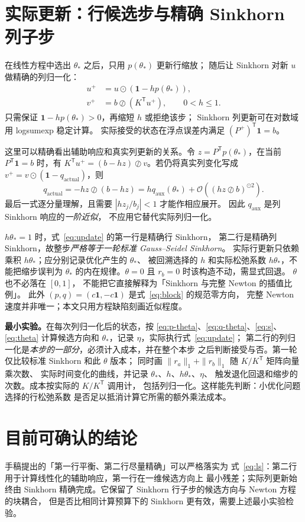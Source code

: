 \documentclass[11pt,a4paper]{ctexart}
\newcommand{\vone}{\bm{1}}
\newcommand{\trans}{\mathsf{T}}
\begin{document}
\section{实际更新：行候选步与精确 Sinkhorn 列子步}

在线性方程中选出 $\theta_*$ 之后，只用 $p(\theta_*)$ 更新行缩放；
随后让 Sinkhorn 对新 $u$ 做精确的列归一化：
\begin{equation}\label{eq:update}
 \boxed{\begin{aligned}
 u^+&=u\odot(\vone-hp(\theta_*)),\\
 v^+&=b\oslash(K^{\trans}u^+),\qquad 0<h\leq1.
 \end{aligned}}
\end{equation}
只需保证 $\vone-hp(\theta_*)>0$，再缩短 $h$ 或拒绝该步；
Sinkhorn 列更新可在对数域用 logsumexp 稳定计算。
实际接受的状态在浮点误差内满足 $(P^+)^{\trans}\vone=b$。

这里可以精确看出辅助响应和真实列更新的关系。令
$z=P^{\trans}p(\theta_*)$，在当前 $P^{\trans}\vone=b$ 时，有
$K^{\trans}u^+=(b-hz)\oslash v$。若仍将真实列变化写成
$v^+=v\odot(\vone-q_{\mathrm{actual}})$，则
\begin{equation}\label{eq:q-actual}
 q_{\mathrm{actual}}=-hz\oslash(b-hz)
 =h q_{\mathrm{aux}}(\theta_*)
   +\mathcal O\!\left((hz\oslash b)^{\odot2}\right).
\end{equation}
最后一式逐分量理解，且需要 $|hz_j/b_j|<1$ 才能作相应展开。
因此 $q_{\mathrm{aux}}$ 是列 Sinkhorn 响应的\emph{一阶近似}，
不应用它替代实际列归一化。

\begin{checknote}
$h\theta_*=1$ 时，式~\eqref{eq:update} 的第一行是精确行 Sinkhorn，
第二行是精确列 Sinkhorn，故整步\emph{严格等于一轮标准 Gauss--Seidel Sinkhorn}。
实际行更新只依赖乘积 $h\theta_*$；应分别记录优化产生的 $\theta_*$、
被回溯选择的 $h$ 和实际松弛系数 $h\theta_*$，不能把缩步误判为
$\theta_*$ 的内在规律。$\theta=0$ 且 $r_b=0$ 时该构造不动，需显式回退。
$\theta$ 也不必落在 $[0,1]$，
不能把它直接解释为「Sinkhorn 与完整 Newton 的插值比例」。
此外 $(p,q)=(c\vone,-c\vone)$ 是式~\eqref{eq:block} 的规范零方向，
完整 Newton 速度并非唯一；本文只用方程缺陷刻画近似程度。
\end{checknote}

\noindent\textbf{最小实验。}在每次列归一化后的状态，按
\eqref{eq:p-theta}、\eqref{eq:q-theta}、\eqref{eq:s}、\eqref{eq:theta}
计算候选方向和 $\theta_*$，记录 $\eta$，实际执行式~\eqref{eq:update}；
第二行的列归一化是\emph{本步的一部分}，必须计入成本，并在整个本步
之后判断接受与否。第一轮仅比较标准 Sinkhorn 和此 $\theta$ 版本；
同时画 $\|r_a\|_1+\|r_b\|_1$ 随 $K/K^{\trans}$ 矩阵向量乘次数、
实际时间变化的曲线，并记录 $\theta_*$、$h$、$h\theta_*$、$\eta$、
触发退化回退和缩步的次数。成本按实际的 $K/K^{\trans}$ 调用计，
包括列归一化。这样能先判断：小优化问题选择的行松弛系数
是否足以抵消计算它所需的额外乘法成本。

\section*{目前可确认的结论}

手稿提出的「第一行平衡、第二行尽量精确」可以严格落实为
式~\eqref{eq:ls}：第二行用于计算线性化的辅助响应，第一行在一维候选方向上
最小残差；实际列更新始终由 Sinkhorn 精确完成。它保留了
Sinkhorn 行子步的候选方向与 Newton 方程的块耦合，
但是否比相同计算预算下的 Sinkhorn 更有效，需要上述最小实验检验。
\end{document}
